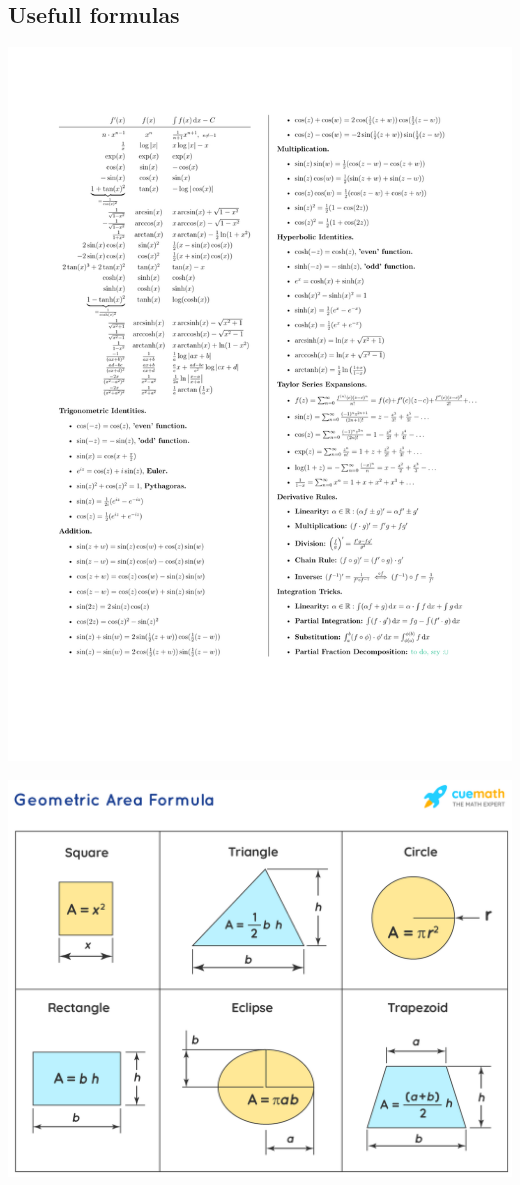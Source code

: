 \documentclass[8pt]{article}
\begin{document}
\begin{multicols*}{2}
  \section{Usefull formulas}
    \begin{minipage}{\linewidth+2cm}
      \includegraphics[width=\linewidth]{./media/Formulas.pdf}
    \end{minipage}
    \columnbreak
    \begin{minipage}{\linewidth-4cm}
      \includegraphics[width=\linewidth]{./media/areas.png}

\end{minipage}
\end{multicols*}
\end{document}
